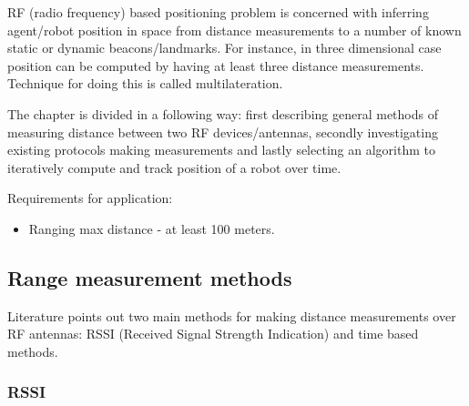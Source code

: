 
RF (radio frequency) based positioning problem is concerned with inferring agent/robot position in space from distance measurements to a number of known static or dynamic beacons/landmarks. For instance, in three dimensional case position can be computed by having at least three distance measurements. Technique for doing this is called multilateration.

The chapter is divided in a following way: first describing general methods of measuring distance between two RF devices/antennas, secondly investigating existing protocols making measurements and lastly selecting an algorithm to iteratively compute and track position of a robot over time.

Requirements for application:
\begin{itemize}
    \item Ranging max distance - at least 100 meters.
\end{itemize}

\subsection{Range measurement methods}

Literature points out two main methods for making distance measurements over RF antennas: RSSI (Received Signal Strength Indication) and time based methods.

\subsubsection{RSSI}

